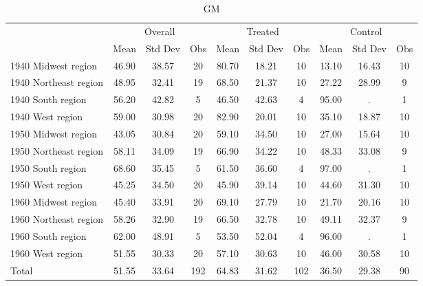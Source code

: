 \begin{table}[htbp]\centering
\def\sym#1{\ifmmode^{#1}\else\(^{#1}\)\fi}
\caption{GM \label{tab1}}
\begin{tabular}{l*{3}{ccc}}
\toprule
                    &\multicolumn{3}{c}{Overall}           &\multicolumn{3}{c}{Treated}           &\multicolumn{3}{c}{Control}           \\
                    &        Mean&     Std Dev&         Obs&        Mean&     Std Dev&         Obs&        Mean&     Std Dev&         Obs\\
\midrule
1940 Midwest region &       46.90&       38.57&          20&       80.70&       18.21&          10&       13.10&       16.43&          10\\
1940 Northeast region&       48.95&       32.41&          19&       68.50&       21.37&          10&       27.22&       28.99&           9\\
1940 South region   &       56.20&       42.82&           5&       46.50&       42.63&           4&       95.00&           .&           1\\
1940 West region    &       59.00&       30.98&          20&       82.90&       20.01&          10&       35.10&       18.87&          10\\
1950 Midwest region &       43.05&       30.84&          20&       59.10&       34.50&          10&       27.00&       15.64&          10\\
1950 Northeast region&       58.11&       34.09&          19&       66.90&       34.22&          10&       48.33&       33.08&           9\\
1950 South region   &       68.60&       35.45&           5&       61.50&       36.60&           4&       97.00&           .&           1\\
1950 West region    &       45.25&       34.50&          20&       45.90&       39.14&          10&       44.60&       31.30&          10\\
1960 Midwest region &       45.40&       33.91&          20&       69.10&       27.79&          10&       21.70&       20.16&          10\\
1960 Northeast region&       58.26&       32.90&          19&       66.50&       32.78&          10&       49.11&       32.37&           9\\
1960 South region   &       62.00&       48.91&           5&       53.50&       52.04&           4&       96.00&           .&           1\\
1960 West region    &       51.55&       30.33&          20&       57.10&       30.63&          10&       46.00&       30.58&          10\\
Total               &       51.55&       33.64&         192&       64.83&       31.62&         102&       36.50&       29.38&          90\\
\bottomrule
\end{tabular}
\end{table}
